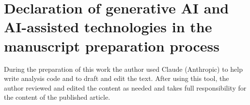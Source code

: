 \documentclass[preprint,12pt,authoryear]{elsarticle}
\begin{document}
\section*{Declaration of generative AI and AI-assisted technologies in the manuscript preparation process}
During the preparation of this work the author used Claude (Anthropic) to help write analysis code and to draft and edit the text. After using this tool, the author reviewed and edited the content as needed and takes full responsibility for the content of the published article.



\end{document}
